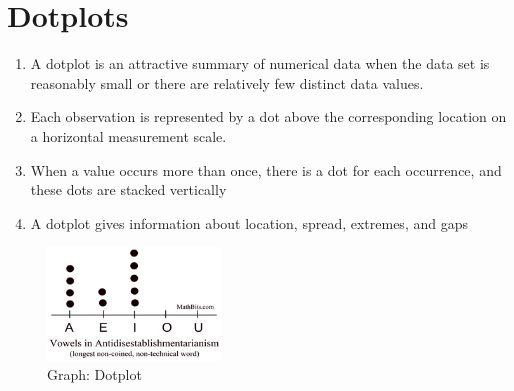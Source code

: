 \section{Dotplots \cite{wiki-dotplot,ism-2}}\label{dotplots}
\begin{enumerate}
    \item A dotplot is an attractive summary of numerical data when the data set is reasonably small or there are relatively few distinct data values. 
    \item Each observation is represented by a dot above the corresponding location on a horizontal measurement scale. 
    \item When a value occurs more than once, there is a dot for each occurrence, and these dots are stacked vertically
    \item A dotplot gives information about location, spread, extremes, and gaps
\end{enumerate}

\begin{figure}
    \centering
    \includegraphics[height=3cm]{Pictures/data/data_dotplot.jpg}
    \caption{Graph: Dotplot}
\end{figure}
